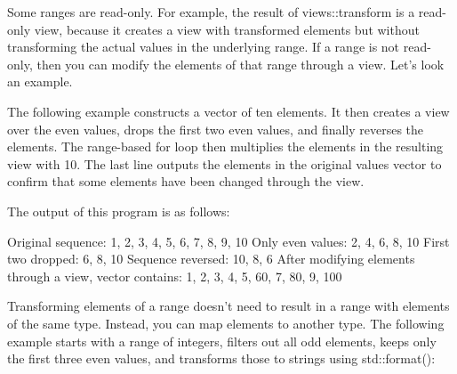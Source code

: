 
Some ranges are read-only. For example, the result of views::transform is a read-only view, because it creates a view with transformed elements but without transforming the actual values in the underlying range. If a range is not read-only, then you can modify the elements of that range through a view. Let’s look an example.

The following example constructs a vector of ten elements. It then creates a view over the even values, drops the first two even values, and finally reverses the elements. The range-based for loop then multiplies the elements in the resulting view with 10. The last line outputs the elements in the original values vector to confirm that some elements have been changed through the view.


The output of this program is as follows:

\begin{shell}
Original sequence: 1, 2, 3, 4, 5, 6, 7, 8, 9, 10
Only even values: 2, 4, 6, 8, 10
First two dropped: 6, 8, 10
Sequence reversed: 10, 8, 6
After modifying elements through a view, vector contains:
1, 2, 3, 4, 5, 60, 7, 80, 9, 100
\end{shell}


Transforming elements of a range doesn’t need to result in a range with elements of the same type. Instead, you can map elements to another type. The following example starts with a range of integers, filters out all odd elements, keeps only the first three even values, and transforms those to strings using std::format():

